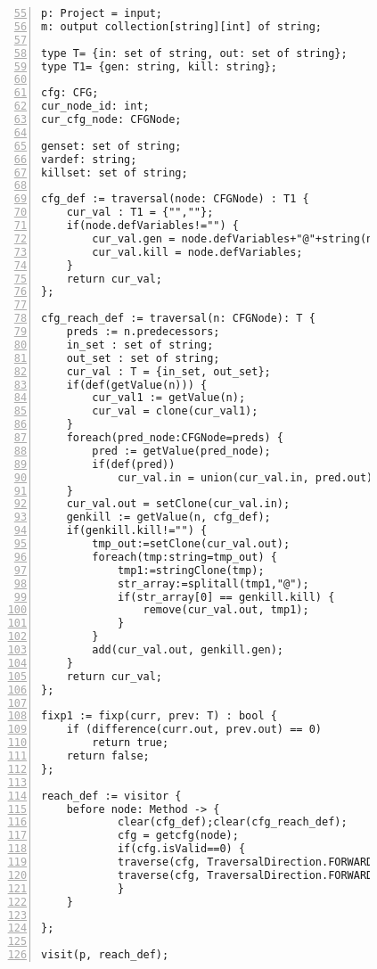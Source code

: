 \begin{figure}[ht!]
\begin{lstlisting}[numbers=left, tabsize=4, caption={Reaching definition analysis},label={lst:rd-code},firstline=55, firstnumber=55] 
p: Project = input;
m: output collection[string][int] of string;

type T= {in: set of string, out: set of string};
type T1= {gen: string, kill: string};

cfg: CFG;
cur_node_id: int;
cur_cfg_node: CFGNode;

genset: set of string;
vardef: string;
killset: set of string;

cfg_def := traversal(node: CFGNode) : T1 {
	cur_val : T1 = {"",""};
	if(node.defVariables!="") {
		cur_val.gen = node.defVariables+"@"+string(node.id);
		cur_val.kill = node.defVariables;
	}
	return cur_val;
};

cfg_reach_def := traversal(n: CFGNode): T {
	preds := n.predecessors;
	in_set : set of string;
	out_set : set of string;
	cur_val : T = {in_set, out_set};
	if(def(getValue(n))) {
		cur_val1 := getValue(n);
		cur_val = clone(cur_val1);
	}
	foreach(pred_node:CFGNode=preds) {	
		pred := getValue(pred_node);
		if(def(pred))
			cur_val.in = union(cur_val.in, pred.out);
	}
	cur_val.out = setClone(cur_val.in);
	genkill := getValue(n, cfg_def);
	if(genkill.kill!="") {
		tmp_out:=setClone(cur_val.out);
		foreach(tmp:string=tmp_out) {
			tmp1:=stringClone(tmp);
			str_array:=splitall(tmp1,"@");
			if(str_array[0] == genkill.kill) {
				remove(cur_val.out, tmp1);
			}
		}
		add(cur_val.out, genkill.gen);
	}
	return cur_val;
};

fixp1 := fixp(curr, prev: T) : bool {
	if (difference(curr.out, prev.out) == 0)
		return true;	
	return false;
};

reach_def := visitor {
	before node: Method -> {
			clear(cfg_def);clear(cfg_reach_def);
			cfg = getcfg(node);
			if(cfg.isValid==0) {
			traverse(cfg, TraversalDirection.FORWARD, TraversalKind.ITERATIVE, cfg_def);
			traverse(cfg, TraversalDirection.FORWARD, TraversalKind.HYBRID, cfg_reach_def, fixp1);
			}
	}

};

visit(p, reach_def);
\end{lstlisting}
\end{figure}